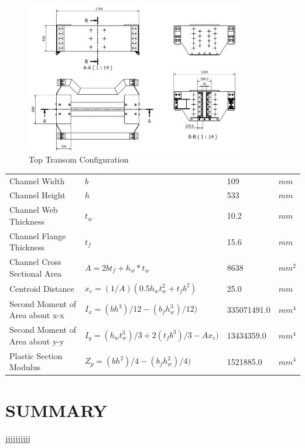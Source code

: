 \documentclass{article}%
\begin{document}
\begin{figure}[h!]%
\includegraphics[width=360px]{Top_Transom.jpg}%
\centering%
\caption{Top Transom Configuration}%
\centering%
\end{figure}

%
\begin{flushleft}%
\begin{minipage}{\textwidth}%
\flushleft%
\begin{tabular}{l l l l}%
Channel Width&$b$&109&$mm$\\%
Channel Height&$h$&533&$mm$\\%
Channel Web Thickness&$t_w$&10.2&$mm$\\%
Channel Flange Thickness&$t_f$&15.6&$mm$\\%
Channel Cross Sectional Area&$A=2bt_f + h_w*t_w$&8638&$mm^2$\\%
Centroid Distance&$x_c=(1/A)(0.5h_wt_w^2 + t_fb^2)$&25.0&$mm$\\%
Second Moment of Area about x{-}x&$I_x=(bh^3)/12 - (b_fh_w^3)/12)$&335071491.0&$mm^4$\\%
Second Moment of Area about y{-}y&$I_y=(h_wt_w^3)/3+2(t_fb^3)/3 - Ax_c)$&13434359.0&$mm^4$\\%
Plastic Section Modulus&$Z_p=(bh^2)/4 - (b_fh_w^2)/4)$&1521885.0&$mm^4$\\%
\end{tabular}%
\end{minipage}%
\end{flushleft}

%
\newpage

%
\section{SUMMARY}%
\label{sec:SUMMARY}%
jjjjjjjjjj

%
\end{document}
